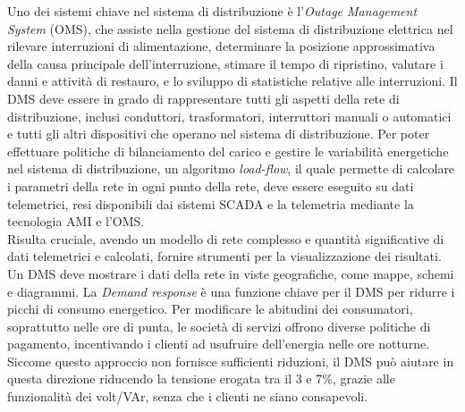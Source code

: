 Uno dei sistemi chiave nel sistema di distribuzione è l'\emph{Outage Management System} (OMS), che assiste nella gestione del sistema di distribuzione elettrica nel rilevare interruzioni di alimentazione, determinare la posizione approssimativa della causa principale dell'interruzione, stimare il tempo di ripristino, valutare i danni e attività di restauro, e lo sviluppo di statistiche relative alle interruzioni. Il DMS deve essere in grado di rappresentare tutti gli aspetti della rete di distribuzione, inclusi conduttori, trasformatori, interruttori manuali o automatici e tutti gli altri dispositivi che operano nel sistema di distribuzione. Per poter effettuare politiche di bilanciamento del carico e gestire le variabilità energetiche nel sistema di distribuzione, un algoritmo \emph{load-flow}, il quale permette di calcolare i parametri della rete in ogni punto della rete, deve essere eseguito su dati telemetrici, resi disponibili dai sistemi SCADA e la telemetria mediante la tecnologia AMI e l'OMS. 
\\
Risulta cruciale, avendo un modello di rete complesso e quantità significative di dati telemetrici e calcolati, fornire strumenti per la visualizzazione dei risultati. Un DMS deve mostrare i dati della rete in viste geografiche, come mappe, schemi e diagrammi. La \emph{Demand response} è una funzione chiave per il DMS per ridurre i picchi di consumo energetico. Per modificare le abitudini dei consumatori, soprattutto nelle ore di punta, le società di servizi offrono diverse politiche di pagamento, incentivando i clienti ad usufruire dell'energia nelle ore notturne. Siccome questo approccio non fornisce sufficienti riduzioni, il DMS può aiutare in questa direzione riducendo la tensione erogata tra il 3 e 7\%, grazie alle funzionalità dei volt/VAr, senza che i clienti ne siano consapevoli.














